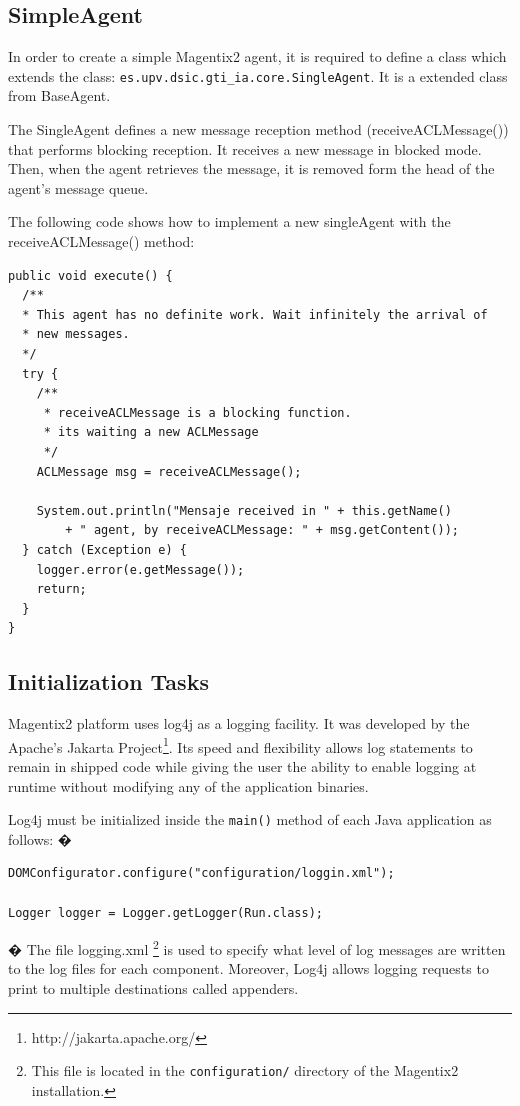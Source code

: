 \subsection{SimpleAgent}\label{sec:SimpleAgent}
In order to create a simple Magentix2 agent, it is required to define a class which extends the class: \lstinline|es.upv.dsic.gti_ia.core.SingleAgent|. It is a extended class from BaseAgent.

The SingleAgent defines a new message reception method (receiveACLMessage()) that performs blocking reception. It receives a new message in blocked mode. Then, when the agent retrieves the message, it is removed form the head of the agent's message queue.

The following code shows how to implement a new singleAgent with the receiveACLMessage() method:
\begin{lstlisting}
public void execute() {
  /**
  * This agent has no definite work. Wait infinitely the arrival of
  * new messages.
  */
  try {
	/**
	 * receiveACLMessage is a blocking function.
	 * its waiting a new ACLMessage
	 */
	ACLMessage msg = receiveACLMessage();

	System.out.println("Mensaje received in " + this.getName()
		+ " agent, by receiveACLMessage: " + msg.getContent());
  } catch (Exception e) {
	logger.error(e.getMessage());
	return;
  }
}

\end{lstlisting}
\subsection{Initialization Tasks}
Magentix2 platform uses log4j as a logging facility. It was developed by the  Apache's Jakarta Project\footnote{http://jakarta.apache.org/}. Its speed and flexibility allows log statements to remain in shipped code while giving the user the ability to enable logging at runtime without modifying any of the application binaries.

Log4j must be initialized inside the \lstinline|main()| method of each Java application as follows:
�
\begin{lstlisting}
DOMConfigurator.configure("configuration/loggin.xml");

Logger logger = Logger.getLogger(Run.class);
\end{lstlisting}
�
The file logging.xml \footnote{This file is located in the \texttt{configuration/} directory of the Magentix2 installation.} is used to specify what level of log messages are written to the log files for each component. Moreover, Log4j allows logging requests to print to multiple destinations called appenders.


